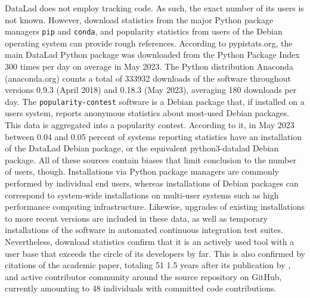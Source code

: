 DataLad does not employ tracking code.
As such, the exact number of its users is not known.
However, download statistics from the major Python package managers \texttt{pip} and \texttt{conda}, and popularity statistics from users of the Debian operating system can provide rough references.
According to pypistats.org, the main DataLad Python package was downloaded from the Python Package Index 300 times per day on average in May 2023.
The Python distribution Anaconda (anaconda.org) counts a total of 333932 downloads of the software throughout versions 0.9.3 (April 2018) and 0.18.3 (May 2023), averaging 180 downloads per day.
The \texttt{popularity-contest} software is a Debian package that, if installed on a users system, reports anonymous statistics about most-used Debian packages.
This data is aggregated into a popularity contest.
According to it, in May 2023 between 0.04 and 0.05 percent of systems reporting statistics have an installation of the DataLad Debian package, or the equivalent python3-datalad Debian package.
All of these sources contain biases that limit conclusion to the number of users, though.
Installations via Python package managers are commonly performed by individual end users, whereas installations of Debian packages can correspond to system-wide installations on multi-user systems such as high performance computing infrastructure.
Likewise, upgrades of existing installations to more recent versions are included in these data, as well as temporary installations of the software in automated continuous integration test suites.
Nevertheless, download statistics confirm that it is an actively used tool with a user base that exceeds the circle of its developers by far.
This is also confirmed by citations of the academic paper, totaling 51 1.5 years after its publication by \citet{Halchenko2021}, and active contributor community around the source repository on GitHub, currently amounting to 48 individuals with committed code contributions.



\pagebreak

